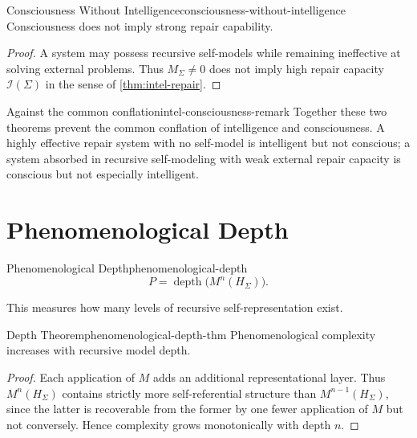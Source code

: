 \documentclass[12pt,twoside,openright]{book}
\begin{document}
\begin{theorem}{Consciousness Without Intelligence}{consciousness-without-intelligence}
  Consciousness does not imply strong repair capability.
\end{theorem}

\begin{proof}
  A system may possess recursive self-models while remaining
  ineffective at solving external problems. Thus
  $M_\Sigma \ne 0$ does not imply high repair capacity
  $\mathcal{I}(\Sigma)$ in the sense of
  \cref{thm:intel-repair}.
\end{proof}

\begin{remark}{Against the common conflation}{intel-consciousness-remark}
  Together these two theorems prevent the common conflation
  of intelligence and consciousness. A highly effective
  repair system with no self-model is intelligent but not
  conscious; a system absorbed in recursive self-modeling
  with weak external repair capacity is conscious but not
  especially intelligent.
\end{remark}

\section{Phenomenological Depth}
\label{sec:ch21-depth}

\begin{definition}{Phenomenological Depth}{phenomenological-depth}
  \[
    P = \operatorname{depth}\bigl(M^n(H_\Sigma)\bigr).
  \]
\end{definition}

This measures how many levels of recursive
self-representation exist.

\begin{theorem}{Depth Theorem}{phenomenological-depth-thm}
  Phenomenological complexity increases with recursive
  model depth.
\end{theorem}

\begin{proof}
  Each application of $M$ adds an additional representational
  layer. Thus $M^n(H_\Sigma)$ contains strictly more
  self-referential structure than $M^{n-1}(H_\Sigma)$, since
  the latter is recoverable from the former by one fewer
  application of $M$ but not conversely. Hence complexity
  grows monotonically with depth $n$.
\end{proof}
\end{document}
